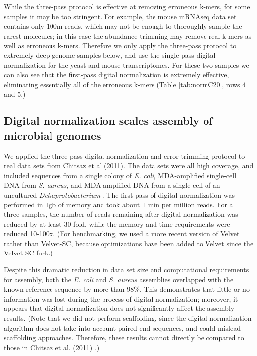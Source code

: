 \documentclass{pnastwo}
\begin{document}
\begin{article}
While the three-pass protocol is effective at removing erroneous
k-mers, for some samples it may be too stringent.  For example, the
mouse mRNAseq data set contains only 100m reads, which may not be
enough to thoroughly sample the rarest molecules; in this case the
abundance trimming may remove real k-mers as well as erroneous k-mers.
Therefore we only apply the three-pass protocol to extremely deep
genome samples below, and use the single-pass digital normalization
for the yeast and mouse transcriptomes.  For these two samples we can
also see that the first-pass digital normalization is extremely effective,
eliminating essentially all of the erroneous k-mers (Table \ref{tab:normC20},
rows 4 and 5.)

\subsection{Digital normalization scales assembly of microbial genomes}

We applied the three-pass digital normalization and error trimming
protocol to real data sets from Chitsaz et al (2011).  The data sets
were all high coverage, and included sequences from a single colony of
{\em E. coli}, MDA-amplified single-cell DNA from {\em S. aureus}, and
MDA-amplified DNA from a single cell of an uncultured {\em
  Deltaprotobacterium} \cite{pubmed21926975}.  The first pass of
digital normalization was performed in 1gb of memory and took about 1
min per million reads.  For all three samples, the number of reads
remaining after digital normalization was reduced by at least 30-fold,
while the memory and time requirements were reduced 10-100x.  (For
benchmarking, we used a more recent version of Velvet rather than
Velvet-SC, because optimizations have been added to Velvet since the
Velvet-SC fork.)

Despite this dramatic reduction in data set size and computational
requirements for assembly, both the {\em E. coli} and {\em S. aureus}
assemblies overlapped with the known reference sequence by more than
98\%.  This demonstrates that little or no information was lost during
the process of digital normalization; moreover, it appears that
digital normalization does not significantly affect the assembly results.
(Note that we did not perform scaffolding, since the digital
normalization algorithm does not take into account paired-end
sequences, and could mislead scaffolding approaches.  Therefore, these
results cannot directly be compared to those in Chitsaz et al. (2011)
\cite{pubmed21926975}.)


\end{article}
\end{document}
